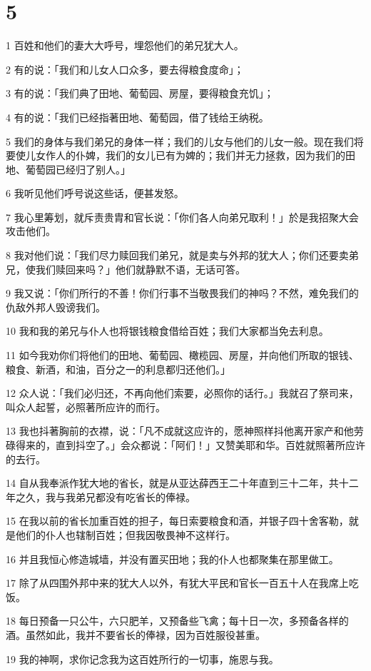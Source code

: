 \chapter{5}

\par 1 百姓和他们的妻大大呼号，埋怨他们的弟兄犹大人。
\par 2 有的说：「我们和儿女人口众多，要去得粮食度命」；
\par 3 有的说：「我们典了田地、葡萄园、房屋，要得粮食充饥」；
\par 4 有的说：「我们已经指著田地、葡萄园，借了钱给王纳税。
\par 5 我们的身体与我们弟兄的身体一样；我们的儿女与他们的儿女一般。现在我们将要使儿女作人的仆婢，我们的女儿已有为婢的；我们并无力拯救，因为我们的田地、葡萄园已经归了别人。」
\par 6 我听见他们呼号说这些话，便甚发怒。
\par 7 我心里筹划，就斥责贵胄和官长说：「你们各人向弟兄取利！」於是我招聚大会攻击他们。
\par 8 我对他们说：「我们尽力赎回我们弟兄，就是卖与外邦的犹大人；你们还要卖弟兄，使我们赎回来吗？」他们就静默不语，无话可答。
\par 9 我又说：「你们所行的不善！你们行事不当敬畏我们的神吗？不然，难免我们的仇敌外邦人毁谤我们。
\par 10 我和我的弟兄与仆人也将银钱粮食借给百姓；我们大家都当免去利息。
\par 11 如今我劝你们将他们的田地、葡萄园、橄榄园、房屋，并向他们所取的银钱、粮食、新酒，和油，百分之一的利息都归还他们。」
\par 12 众人说：「我们必归还，不再向他们索要，必照你的话行。」我就召了祭司来，叫众人起誓，必照著所应许的而行。
\par 13 我也抖著胸前的衣襟，说：「凡不成就这应许的，愿神照样抖他离开家产和他劳碌得来的，直到抖空了。」会众都说：「阿们！」又赞美耶和华。百姓就照著所应许的去行。
\par 14 自从我奉派作犹大地的省长，就是从亚达薛西王二十年直到三十二年，共十二年之久，我与我弟兄都没有吃省长的俸禄。
\par 15 在我以前的省长加重百姓的担子，每日索要粮食和酒，并银子四十舍客勒，就是他们的仆人也辖制百姓；但我因敬畏神不这样行。
\par 16 并且我恒心修造城墙，并没有置买田地；我的仆人也都聚集在那里做工。
\par 17 除了从四围外邦中来的犹大人以外，有犹大平民和官长一百五十人在我席上吃饭。
\par 18 每日预备一只公牛，六只肥羊，又预备些飞禽；每十日一次，多预备各样的酒。虽然如此，我并不要省长的俸禄，因为百姓服役甚重。
\par 19 我的神啊，求你记念我为这百姓所行的一切事，施恩与我。

